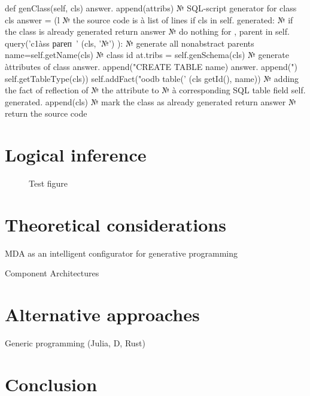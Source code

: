\documentclass{intech}
\begin{document}
def genClass(self, cls)
answer. append(attribs)
№ SQL-script generator for class cls
answer = (l
№ the source code is à list of lines
if cls in self. generated:
№ if the class is already generated
return answer № do nothing
for , parent in
self. query('c1àss рагеп~'
(cls, '№') ):
№ generate all nonabstract parents
name=self.getName(cls) № class id
at.tribs = self.genSchema(cls)
№ generate àttributes of class
answer. append("CREATE TABLE %
name)
answer. append(")%
self.getTableType(cls))
self.addFact("oodb table('%
(cls getId(), name))
№ adding the fact of reflection of
№ the attribute to
№ à corresponding SQL table field
self. generated. append(cls)
№ mark the class as already generated
return answer № return the source code

\section{Logical inference}
\label{sec:log-inf}

\begin{figure}[htb]
  \centering

  \caption{Test figure}
  \label{fig:test-fig}
\end{figure}

\begin{table}[htb]
  \centering

  \caption{Test Table}
  \label{tab:test-tbl}
\end{table}

\section{Theoretical considerations}
\label{sec:theor-general}

MDA as an intelligent configurator for generative programming

Component Architectures

\section{Alternative approaches}
\label{sec:alt}

Generic programming (Julia, D, Rust)



\section{Conclusion}
\end{document}
